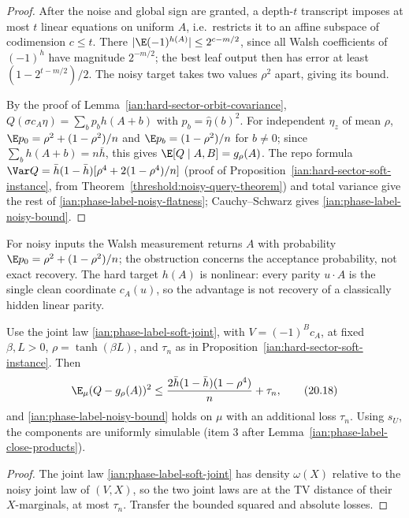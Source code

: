 \begin{proof}
After the noise and global sign are granted, a depth-\(t\) transcript
imposes at most \(t\) linear equations on uniform \(A\), i.e.\ restricts
it to an affine subspace of codimension \(c\le t\). There
\(|\E(-1)^{h(A)}|\le2^{c-m/2}\), since all Walsh coefficients of
\((-1)^h\) have magnitude \(2^{-m/2}\); the best leaf output then has
error at least \((1-2^{t-m/2})/2\). The noisy target takes two values
\(\rho^2\) apart, giving its bound.

By the proof of Lemma~\ref{ian:hard-sector-orbit-covariance},
\(Q(\sigma c_A\eta)=\sum_bp_bh(A+b)\) with \(p_b=\widehat\eta(b)^2\).
For independent \(\eta_z\) of mean \(\rho\),
\(\E p_0=\rho^2+(1-\rho^2)/n\) and \(\E p_b=(1-\rho^2)/n\) for \(b\ne0\);
since \(\sum_bh(A+b)=n\bar h\), this gives \(\E[Q\mid A,B]=g_\rho(A)\).
The repo formula \(\Var Q=\bar h(1-\bar h)[\rho^4+2(1-\rho^4)/n]\) (proof of
Proposition~\ref{ian:hard-sector-soft-instance}, from
Theorem~\ref{threshold:noisy-query-theorem}) and total variance give the
rest of \eqref{ian:phase-label-noisy-flatness}; Cauchy--Schwarz gives
\eqref{ian:phase-label-noisy-bound}.
\end{proof}

For noisy inputs the Walsh measurement returns \(A\) with probability
\(\E p_0=\rho^2+(1-\rho^2)/n\); the obstruction concerns the acceptance
probability, not exact recovery. The hard target \(h(A)\) is nonlinear:
every parity \(u\cdot A\) is the single clean coordinate \(c_A(u)\), so
the advantage is not recovery of a classically hidden linear parity.

\begin{proposition}
\label{ian:phase-label-soft-instance}
Use the joint law \eqref{ian:phase-label-soft-joint}, with
\(V=(-1)^Bc_A\), at fixed \(\beta,L>0\), \(\rho=\tanh(\beta L)\), and
\(\tau_n\) as in Proposition~\ref{ian:hard-sector-soft-instance}. Then
\[
 \E_\mu(Q-g_\rho(A))^2
 \le \frac{2\bar h(1-\bar h)(1-\rho^4)}n+\tau_n,
 \tag{20.18}\label{ian:phase-label-soft-flatness}
\]
and \eqref{ian:phase-label-noisy-bound} holds on \(\mu\) with an
additional loss \(\tau_n\). Using \(s_U\), the components are
uniformly simulable (item 3 after
Lemma~\ref{ian:phase-label-close-products}).
\end{proposition}

\begin{proof}
The joint law \eqref{ian:phase-label-soft-joint} has density
\(\omega(X)\) relative to the noisy joint law of \((V,X)\), so the two
joint laws are at the TV distance of their \(X\)-marginals, at most
\(\tau_n\). Transfer the bounded squared and absolute losses.
\end{proof}

